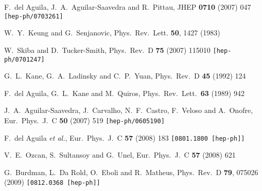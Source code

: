 \documentclass[12pt,a4paper]{article}
\begin{document}
\begin{thebibliography}{99}
  F.~del Aguila, J.~A.~Aguilar-Saavedra and R.~Pittau,
  JHEP {\bf 0710} (2007) 047
  {\tt [hep-ph/0703261]}

W.~Y.~Keung and G.~Senjanovic,
Phys.\ Rev.\ Lett. {\bf 50}, 1427 (1983)


  W.~Skiba and D.~Tucker-Smith,
  Phys.\ Rev.\  D {\bf 75} (2007) 115010
  {\tt [hep-ph/0701247]}


  G.~L.~Kane, G.~A.~Ladinsky and C.~P.~Yuan,
  Phys.\ Rev.\  D {\bf 45} (1992) 124

  F.~del Aguila, G.~L.~Kane and M.~Quiros,
  Phys.\ Rev.\ Lett.\  {\bf 63} (1989) 942

  J.~A.~Aguilar-Saavedra, J.~Carvalho, N.~F.~Castro, F.~Veloso and A.~Onofre,
  Eur.\ Phys.\ J.\  C {\bf 50} (2007) 519
  {\tt [hep-ph/0605190]}


  F.~del Aguila {\it et al.},
  Eur.\ Phys.\ J.\  C {\bf 57} (2008) 183
  {\tt [0801.1800 [hep-ph]]}

  V.~E.~Ozcan, S.~Sultansoy and G.~Unel,
  Eur.\ Phys.\ J.\  C {\bf 57} (2008) 621

  G.~Burdman, L.~Da Rold, O.~Eboli and R.~Matheus,
  Phys.\ Rev.\  D {\bf 79}, 075026 (2009)
  {\tt [0812.0368 [hep-ph]]}

\end{thebibliography}
\end{document}
